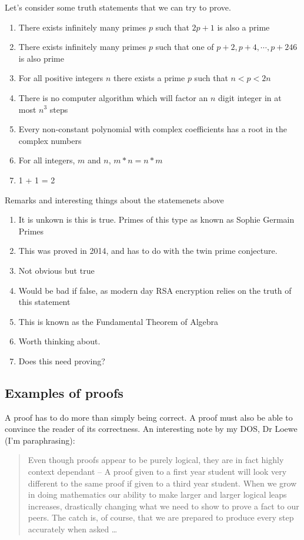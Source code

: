 \documentclass{article}
\begin{document}
\begin{eg}
    Let's consider some truth statements that we can try to prove.
    \begin{enumerate}
        \item There exists infinitely many primes $p$ such that $2p + 1$ is also a prime
        \item There exists infinitely many primes $p$ such that one of $p+2, p+4, \cdots, p+246$ is also prime
        \item For all positive integers $n$ there exists a prime $p$ such that $n < p < 2n$
        \item There is no computer algorithm which will factor an $n$ digit integer in at most $n^3$ steps
        \item Every non-constant polynomial with complex coefficients has a root in the complex numbers
        \item For all integers, $m$ and $n$, $m * n = n * m$
        \item 1 + 1 = 2
    \end{enumerate}
    Remarks and interesting things about the statemenets above
    \begin{enumerate}
        \item It is unkown is this is true. Primes of this type as known as Sophie Germain Primes
        \item This was proved in 2014, and has to do with the twin prime conjecture.
        \item Not obvious but true
        \item Would be bad if false, as modern day RSA encryption relies on the truth of this statement
        \item This is known as the Fundamental Theorem of Algebra
        \item Worth thinking about. 
        \item Does this need proving?
    \end{enumerate}
\end{eg}
\subsection{Examples of proofs}

A proof has to do more than simply being correct. A proof must also be able to convince the reader of its correctness. An interesting note by my DOS, Dr Loewe (I'm paraphrasing): 
\begin{quote}
    Even though proofs appear to be purely logical, they are in fact highly context dependant -- A proof given to a first year student will look very different to the same proof if given to a third year student. When we grow in doing mathematics our ability to make larger and larger logical leaps increases, drastically changing what we need to show to prove a fact to our peers. The catch is, of course, that we are prepared to produce every step accurately when asked \ldots
\end{quote}
\end{document}
